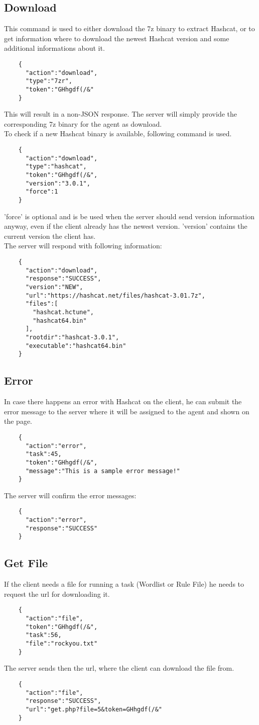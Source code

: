 \documentclass{article}
\begin{document}
	\subsection*{Download}
	This command is used to either download the 7z binary to extract Hashcat, or to get information where to download the newest Hashcat version and some additional informations about it.
	\begin{verbatim}
	{
	  "action":"download",
	  "type":"7zr",
	  "token":"GHhgdf(/&"
	}
	\end{verbatim}
	This will result in a non-JSON response. The server will simply provide the corresponding 7z binary for the agent as download.\\
	To check if a new Hashcat binary is available, following command is used.
	\begin{verbatim}
	{
	  "action":"download",
	  "type":"hashcat",
	  "token":"GHhgdf(/&",
	  "version":"3.0.1",
	  "force":1
	}
	\end{verbatim}
	'force' is optional and is be used when the server should send version information anyway, even if the client already has the newest version. 'version' contains the current version the client has.\\
	The server will respond with following information:
	\begin{verbatim}
	{
	  "action":"download",
	  "response":"SUCCESS",
	  "version":"NEW",
	  "url":"https://hashcat.net/files/hashcat-3.01.7z",
	  "files":[
	    "hashcat.hctune",
	    "hashcat64.bin"
	  ],
	  "rootdir":"hashcat-3.0.1",
	  "executable":"hashcat64.bin"
	}
	\end{verbatim}
	
	\subsection*{Error}
	In case there happens an error with Hashcat on the client, he can submit the error message to the server where it will be assigned to the agent and shown on the page.
	\begin{verbatim}
	{
	  "action":"error",
	  "task":45,
	  "token":"GHhgdf(/&",
	  "message":"This is a sample error message!"
	}
	\end{verbatim}
	The server will confirm the error messages:
	\begin{verbatim}
	{
	  "action":"error",
	  "response":"SUCCESS"
	}
	\end{verbatim}
	
	\subsection*{Get File}
	If the client needs a file for running a task (Wordlist or Rule File) he needs to request the url for downloading it.
	\begin{verbatim}
	{
	  "action":"file",
	  "token":"GHhgdf(/&",
	  "task":56,
	  "file":"rockyou.txt"
	}
	\end{verbatim}
	The server sends then the url, where the client can download the file from.
	\begin{verbatim}
	{
	  "action":"file",
	  "response":"SUCCESS",
	  "url":"get.php?file=5&token=GHhgdf(/&"
	}
	\end{verbatim}
	
\end{document}
